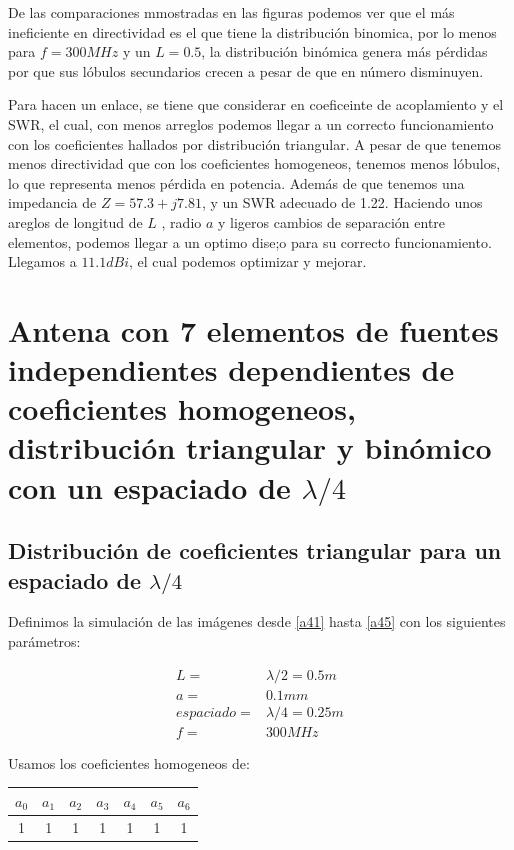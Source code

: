 \documentclass[11pt]{book}
\begin{document}
De las comparaciones mmostradas en las figuras podemos ver que el más ineficiente en directividad es el que tiene la distribución binomica, por lo menos para $f=300MHz$ y un $L=0.5$, la distribución binómica genera más pérdidas por que sus lóbulos secundarios crecen a pesar de que en número disminuyen.


Para hacen un enlace, se tiene que considerar en coeficeinte de acoplamiento y el SWR, el cual, con menos arreglos podemos llegar a un correcto funcionamiento con los coeficientes hallados por distribución triangular. A pesar de que tenemos menos directividad que con los coeficientes homogeneos, tenemos menos lóbulos, lo que representa menos pérdida en potencia. Además de que tenemos una impedancia de $Z = 57.3 + j7.81$, y un SWR adecuado de 1.22. Haciendo unos areglos de longitud de $L$ , radio $a$ y ligeros cambios de separación entre elementos, podemos llegar a un optimo dise;o para su correcto funcionamiento. Llegamos a $11.1dBi$, el cual podemos optimizar y mejorar.

\newpage


\chapter{Antena con 7 elementos de fuentes independientes dependientes de coeficientes homogeneos, distribución triangular y binómico con un espaciado de $\lambda/4$}

\newpage

\section{Distribución de coeficientes triangular para un espaciado de $\lambda/4$}

Definimos la simulación de las imágenes desde \eqref{a41} hasta \eqref{a45} con los siguientes parámetros:

\begin{align*}
	L = &\lambda/2 =  0.5m \\
	a = & 0.1mm \\
	espaciado = & \lambda / 4 = 0.25m \\
	f = & 300MHz
\end{align*}

Usamos los coeficientes homogeneos de:

\begin{tabular}{c|c|c|c|c|c|c}
	$a_0$ & $a_1$ & $a_2$ & $a_3$ & $a_4$ & $a_5$ & $a_6$ \\ \hline
	1 & 1 & 1 & 1 & 1 & 1 & 1 \\
\end{tabular}
\end{document}
